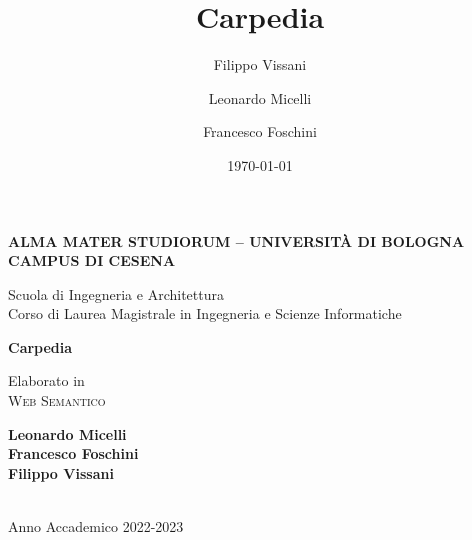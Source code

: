 \title{Carpedia}
\author{Filippo Vissani}
\author{Leonardo Micelli}
\author{Francesco Foschini}
\date{\today}

\begin{titlepage}
	\begin{center}
		
		\large
		\textbf{ALMA MATER STUDIORUM -- UNIVERSITÀ DI BOLOGNA \\ CAMPUS DI CESENA}
		\\
		\noindent\hrulefill
		\vspace{0.4cm}
		
		\Large
		Scuola di Ingegneria e Architettura \\
		Corso di Laurea Magistrale in Ingegneria e Scienze Informatiche
		
		\Huge
		\vspace{4cm}
		\textbf{
			Carpedia
		}
		
		\large
		\vspace{1cm}
		Elaborato in 
		\\
		\textsc{Web Semantico}
		
		\vspace{5.5cm}
		\begin{minipage}[t]{0.64\textwidth}
			\begin{flushleft}
				\textbf{Leonardo Micelli}
				\\
				\textbf{Francesco Foschini}
				\\
				\textbf{Filippo Vissani}
			\end{flushleft}
		\end{minipage}
		
		\vfill
		\noindent\hrulefill
		\vspace{0.3cm}
		\Large
		\\
		Anno Accademico 2022-2023
	\end{center}
\end{titlepage}
\restoregeometry
